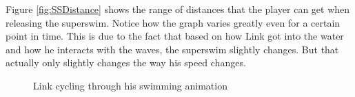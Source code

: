 \documentclass[titlepage,12pt,a4paper]{article}
\begin{document}
Figure \ref{fig:SSDistance} shows the range of distances that the player can get when releasing the superswim. Notice how the graph varies greatly even for a certain point in time. This is due to the fact that based on how Link got into the water and how he interacts with the waves, the superswim slightly changes. But that actually only slightly changes the way his speed changes. 

\begin{figure}[htp]
    \hfill
    \hfill
    \hfill
    \hfill
    \caption{Link cycling through his swimming animation}
    \label{fig:SSFrames}
\end{figure}
\end{document}
